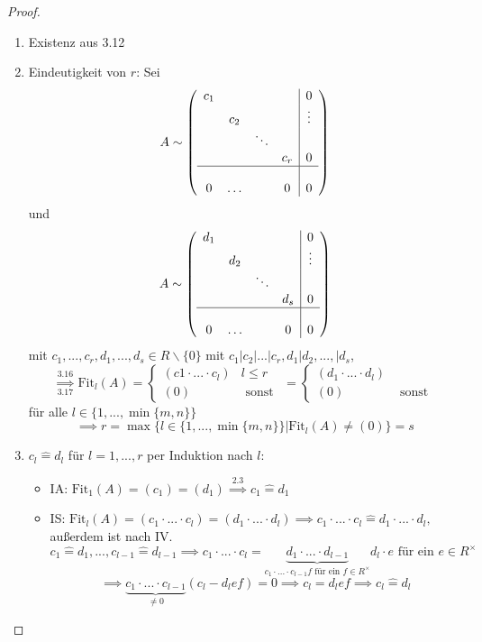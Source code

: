 \documentclass[a4paper, titlepage]{article}
\theoremstyle{definition}
\newcommand{\Fit}{\mathrm{Fit}}
\begin{document}
\begin{proof}
    \begin{enumerate}
        \item Existenz aus 3.12
        \item Eindeutigkeit von $r$:
            Sei 
            $$A\sim \left(\begin{array}{cccc|c}
                c_1& & & &0\\
                & c_2& & & \vdots \\  
                & & \ddots& & \\
                & & & c_r&0 \\
                \hline & & & & \\
                0&\hdots &\ &0 & 0\\
            \end{array}\right)$$ 
            und 
            $$A\sim \left(\begin{array}{cccc|c}
                d_1& & & &0\\
                & d_2& & & \vdots \\  
                & & \ddots& & \\
                & & & d_s&0 \\
                \hline & & & & \\
                0&\hdots &\ &0 & 0\\
            \end{array}\right)$$
            mit $c_1,...,c_r,d_1,...,d_s\in R\backslash\{0\}$ mit $c_1|c_2|...|c_r,d_1|d_2,...,|d_s$,
        $$\overset{3.16}{\underset{3.17}{\implies}} \Fit_{l}(A)=\left\{\begin{array}{cc} (c1\cdot ...\cdot c_l) & l\leq r\\ (0) & \text{ sonst }\end{array}\right. =\left\{\begin{array}{cc} (d_1\cdot ...\cdot d_l)\\ (0) & \text{ sonst }\end{array}\right.$$ für alle $l\in\{1,...,\min\{m,n\}\}$
        $$ \implies r=\max\{l\in\{1,...,\min\{m,n\}\}|\Fit_{l}(A)\neq (0)\}=s$$
        \item $c_l\widehat=d_l$ für $l=1,...,r$ per Induktion nach $l$:
        \begin{itemize}
             \item IA: $\Fit_{1}(A)= (c_1)=(d_1)\overset{2.3}{\implies} c_1\widehat=d_1$
             \item IS: $\Fit_{l}(A)=(c_1\cdot...\cdot c_l)=(d_1\cdot ... \cdot d_l)\implies c_1\cdot ...\cdot c_l\widehat=d_1\cdot ... \cdot d_l,$ außerdem ist nach IV.
                $$c_1\widehat=d_1,...,c_{l-1}\widehat=d_{l-1}\implies c_1\cdot ... \cdot c_l=\underbrace{d_1\cdot...\cdot d_{l-1}}_{c_1\cdot ... \cdot c_{l-1}f \text{ für ein }f\in R^{\times}}d_l\cdot e\text{ für ein }e\in R^{\times}$$
                $$\implies \underbrace{c_1\cdot ... \cdot c_{l-1}}_{\neq 0}(c_l-d_lef)=0\implies c_l=d_lef \implies c_l\widehat= d_l$$
        \end{itemize}
        \end{enumerate}
    \end{proof}
\end{document}
